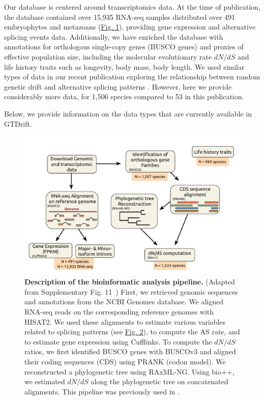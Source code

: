 Our database is centered around transcriptomics data. At the time of publication, the database contained over 15,935 RNA-seq samples distributed over 491 embryophytes and metazoans (\hyperref[fig:gtdrift1]{Fig. 1}), providing gene expression and alternative splicing events data. Additionally, we have enriched the database with annotations for orthologous single-copy genes (\acrshort{BUSCO} genes) and proxies of effective population size, including the molecular evolutionary rate ${dN}/{dS}$ and life history traits such as longevity, body mass, body length. We used similar types of data in our recent publication exploring the relationship between random genetic drift and alternative splicing patterns \citep{benitiere_random_2024}. However, here we provide considerably more data, for 1,506 species compared to 53 in this publication. 

Below, we provide information on the data types that are currently available in GTDrift. 

\begin{figure}[t]   
         \centering
        \includegraphics[width=\textwidth]{Figure4.pdf}
                                                                           
    \caption[Description of the bioinformatic analysis pipeline]{\textbf{Description of the bioinformatic analysis pipeline.} (Adapted from Supplementary Fig. 11~\citet{benitiere_random_2024}) First, we retrieved genomic sequences and annotations from the NCBI Genomes database. We aligned RNA-seq reads on the corresponding reference genomes  with HISAT2. We used these alignments to estimate various variables related to splicing patterns (see \hyperref[fig:gtdrift2]{Fig. 2}), to compute the \acrshort{AS} rate, and to estimate gene expression using Cufflinks. To compute the ${dN}/{dS}$ ratios, we first identified \acrshort{BUSCO} genes with \acrshort{BUSCO}v3 and aligned their coding sequences (CDS) using PRANK (codon model). We reconstructed a phylogenetic tree using RAxML-NG. Using bio++, we estimated ${dN}/{dS}$ along the phylogenetic tree on concatenated alignments. This pipeline was previously used in \citet{benitiere_random_2024}.\newline} 
    \label{fig:gtdrift4}
\end{figure}

